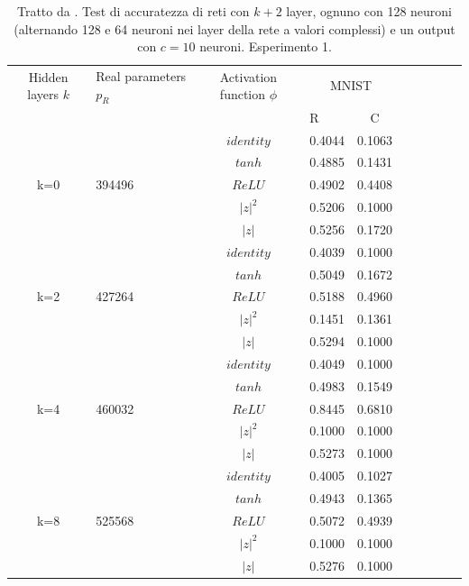 \documentclass[a4paper,12pt]{report}
\begin{document}
 \begin{table}
  \centering
  \begin{tabular}{cp{} cp{}   cp{} cp{} cp{}}
   \cline{1-5}
   Hidden layers $k$ & Real parameters $p_R$ & Activation function $\phi$ & \multicolumn{2}{c}{MNIST}\\
   \cline{4-5}
   & & & R & C \\
   \cline{1-5}
   & & $identity$ & 0.4044 & 0.1063 \\
   \cline{3-5}
   & & $tanh$ & 0.4885 & 0.1431 \\
   \cline{3-5}
   k=0 & 394496 & $ReLU$ & 0.4902 & 0.4408 \\
   \cline{3-5}
   & & $|z|^2$ & 0.5206 & 0.1000 \\
   \cline{3-5}
   & & $|z|$ & 0.5256 & 0.1720 \\
   \cline{1-5}
  
   & & $identity$ & 0.4039 & 0.1000 \\
   \cline{3-5}
   & & $tanh$ & 0.5049 & 0.1672 \\
   \cline{3-5}
   k=2 & 427264 & $ReLU$ & 0.5188 & 0.4960 \\
   \cline{3-5}
   & & $|z|^2$ & 0.1451 & 0.1361 \\
   \cline{3-5}
   & & $|z|$ & 0.5294 & 0.1000 \\
   \cline{1-5}
  
   & & $identity$ & 0.4049 & 0.1000 \\
   \cline{3-5}
   & & $tanh$ & 0.4983 & 0.1549 \\
   \cline{3-5}
   k=4 & 460032 & $ReLU$ & 0.8445 & 0.6810 \\
   \cline{3-5}
   & & $|z|^2$ & 0.1000 & 0.1000 \\
   \cline{3-5}
   & & $|z|$ & 0.5273 & 0.1000 \\
   \cline{1-5}
   
   & & $identity$ & 0.4005 & 0.1027 \\
   \cline{3-5}
   & & $tanh$ & 0.4943 & 0.1365 \\
   \cline{3-5}
   k=8 & 525568 & $ReLU$ & 0.5072 & 0.4939 \\
   \cline{3-5}
   & & $|z|^2$ & 0.1000 & 0.1000 \\
   \cline{3-5}
   & & $|z|$ & 0.5276 & 0.1000 \\
   \cline{1-5}
  \end{tabular}
  \caption{Tratto da \cite{monning2018evaluation}. Test di accuratezza di reti con $k+2$ layer, ognuno con 128 neuroni (alternando 128 e 64 neuroni nei layer della rete a valori complessi) e un output con $c=10$ neuroni. Esperimento 1.}
  \label{CIFAR-101Tab}
 \end{table}
 
\end{document}
